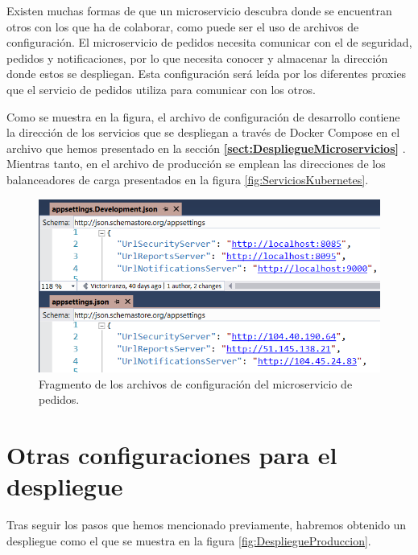 \documentclass[11pt,spanish,listoffigures]{tfgetsinf}
\begin{document}
Existen muchas formas de que un microservicio descubra donde se encuentran otros con los que ha de colaborar, como puede ser el uso de archivos de configuración. El microservicio de pedidos necesita comunicar con el de seguridad, pedidos y notificaciones, por lo que necesita conocer y almacenar la dirección donde estos se despliegan. Esta configuración será leída por los diferentes proxies que el servicio de pedidos utiliza para comunicar con los otros.

Como se muestra en la figura, el archivo de configuración de desarrollo contiene la dirección de los servicios que se despliegan a través de Docker Compose en el archivo que hemos presentado en la sección \textbf{\ref{sect:DespliegueMicroservicios} }. Mientras tanto, en el archivo de producción se emplean las direcciones de los balanceadores de carga presentados en la figura \ref{fig:ServiciosKubernetes}.

\begin{figure}[h]
\centering
\includegraphics[scale=0.7]{appsettings}
\caption{Fragmento de los archivos de configuración del microservicio de pedidos.}
\label{fig:appsettings}
\end{figure}

\newpage

\section{Otras configuraciones para el despliegue} \label{sect:DespliegueOtros}

Tras seguir los pasos que hemos mencionado previamente, habremos obtenido un despliegue como el que se muestra en la figura \ref{fig:DespliegueProduccion}.
\end{document}
